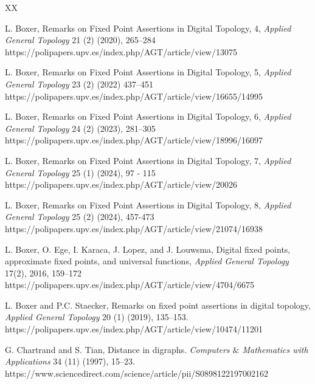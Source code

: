 \documentclass{article}
\numberwithin{thm}{section}
\begin{document}
\begin{thebibliography}{XX}

 L. Boxer, Remarks on Fixed Point Assertions in Digital Topology, 4, 
 {\em Applied General Topology} 21 (2) (2020), 265--284
\newline
https://polipapers.upv.es/index.php/AGT/article/view/13075

L. Boxer, Remarks on Fixed Point Assertions in 
Digital Topology, 5, 
{\em Applied General Topology} 
23 (2) (2022) 437--451
\newline
https://polipapers.upv.es/index.php/AGT/article/view/16655/14995

L. Boxer, Remarks on Fixed Point Assertions in Digital Topology, 6,
{\em Applied General Topology}
24 (2) (2023), 
281--305
\newline
https://polipapers.upv.es/index.php/AGT/article/view/18996/16097

L. Boxer,
Remarks on Fixed Point Assertions in Digital Topology, 7,
{\em Applied General Topology} 25 (1) (2024), 97 - 115
\newline
https://polipapers.upv.es/index.php/AGT/article/view/20026

L. Boxer, Remarks on Fixed Point Assertions in Digital Topology, 8, 
{\em Applied General Topology} 25 (2) (2024), 457-473
\newline
https://polipapers.upv.es/index.php/AGT/article/view/21074/16938

 L. Boxer, O. Ege, I. Karaca, J. Lopez, and J. Louwsma,
 Digital fixed points, approximate fixed points, 
 and universal functions, 
 {\em Applied General Topology} 17(2), 2016, 159--172
 \newline
 https://polipapers.upv.es/index.php/AGT/article/view/4704/6675

L. Boxer and P.C. Staecker,
Remarks on fixed point assertions in digital topology,
{\em Applied General Topology} 20 (1) (2019), 135--153.
\newline
https://polipapers.upv.es/index.php/AGT/article/view/10474/11201

G. Chartrand and S. Tian, 
Distance in digraphs. 
{\em Computers $\&$ Mathematics with Applications}
34 (11) (1997), 15--23.
\newline
https://www.sciencedirect.com/science/article/pii/S0898122197002162



\end{thebibliography}
\end{document}
